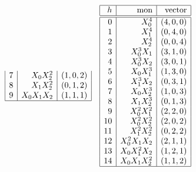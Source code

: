 \begin{table}
$$\begin{array}{|r|r|r|}
7 & X_0X_2^2 & ( 1, 0, 2 )\\
8 & X_1X_2^2 & ( 0, 1, 2 )\\
9 & X_0X_1X_2 & ( 1, 1, 1 )\\
\hline
\end{array}
\quad
\begin{array}{|r|r|r|}
\hline
h &  \mbox{mon} & \mbox{vector} \\
\hline
\hline
0 & X_0^4 & ( 4, 0, 0 )\\
1 & X_1^4 & ( 0, 4, 0 )\\
2 & X_2^4 & ( 0, 0, 4 )\\
3 & X_0^3X_1 & ( 3, 1, 0 )\\
4 & X_0^3X_2 & ( 3, 0, 1 )\\
5 & X_0X_1^3 & ( 1, 3, 0 )\\
6 & X_1^3X_2 & ( 0, 3, 1 )\\
7 & X_0X_2^3 & ( 1, 0, 3 )\\
8 & X_1X_2^3 & ( 0, 1, 3 )\\
9 & X_0^2X_1^2 & ( 2, 2, 0 )\\
10 & X_0^2X_2^2 & ( 2, 0, 2 )\\
11 & X_1^2X_2^2 & ( 0, 2, 2 )\\
12 & X_0^2X_1X_2 & ( 2, 1, 1 )\\
13 & X_0X_1^2X_2 & ( 1, 2, 1 )\\
14 & X_0X_1X_2^2 & ( 1, 1, 2 )\\
\hline
\end{array}
$$
\caption{\label{tab:PG2monomials}The partition ordering of monomials of degree $1$, $2,$ $3$ and $4$ in a plane}
\end{table}

\bigskip

